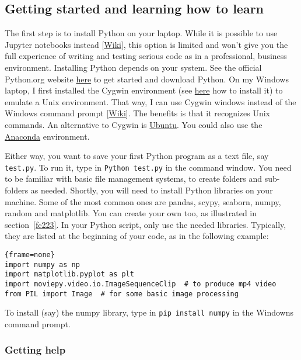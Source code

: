 \documentclass[oneside,10pt]{book}
\begin{document}
\subsection{Getting started and learning how to learn}\label{staerqlk}

The first step is to install Python on your laptop. While it is possible to use Jupyter notebooks instead [\href{https://jupyter.org/}{Wiki}], this option is limited and won't give you the full experience of writing and testing serious code as in a professional, business environment. Installing Python depends on your system. See the official Python.org website \href{https://www.python.org/downloads/}{here} to get started and download Python. On my Windows laptop, I first installed the Cygwin environment (see \href{https://www.cygwin.com/}{here} how to install it) to emulate a Unix environment. That way, I can use Cygwin windows instead of the Windows command prompt [\href{https://en.wikipedia.org/wiki/Cmd.exe}{Wiki}]. The benefits is that it recognizes Unix commands. An alternative to Cygwin is
\href{https://ubuntu.com/download}{Ubuntu}. You could also use the \href{https://www.anaconda.com/products/distribution}{Anaconda} environment.

Either way, you want to save your first Python program as a text file, say \texttt{test.py}. To run it, type in \texttt{Python test.py} in the command window. You need to be familiar with basic file management systems, to create folders and sub-folders as needed. Shortly, you will need to install Python libraries on your machine. Some of the  most common ones are pandas, scypy, seaborn, numpy, random and matplotlib. You can create your own too, as illustrated in section~\ref{fc223}. In your Python script, only use the needed libraries. Typically, they are listed at the beginning of your code, as in the following example:

\begin{lstlisting}{frame=none}
import numpy as np
import matplotlib.pyplot as plt
import moviepy.video.io.ImageSequenceClip  # to produce mp4 video
from PIL import Image  # for some basic image processing
\end{lstlisting}

\noindent To install (say) the numpy library, type in \texttt{pip install numpy} in the Windowns command prompt.

\subsubsection{Getting help}
\end{document}
